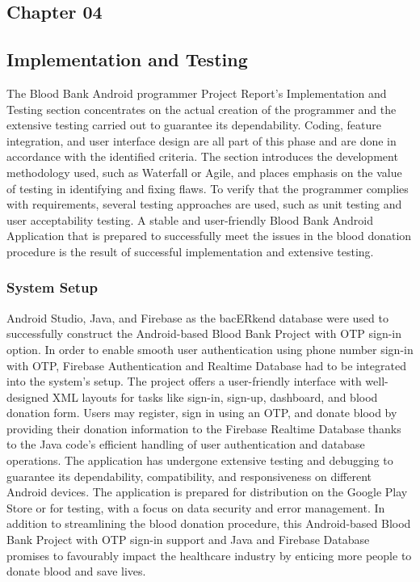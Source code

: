 \begin{center}
\chapter{Chapter 04}
\end{center}
\vspace{11mm}
\section{Implementation and Testing}
The Blood Bank Android programmer Project Report's Implementation and Testing section concentrates on the actual creation of the programmer and the extensive testing carried out to guarantee its dependability. Coding, feature integration, and user interface design are all part of this phase and are done in accordance with the identified criteria. The section introduces the development methodology used, such as Waterfall or Agile, and places emphasis on the value of testing in identifying and fixing flaws. To verify that the programmer complies with requirements, several testing approaches are used, such as unit testing and user acceptability testing. A stable and user-friendly Blood Bank Android Application that is prepared to successfully meet the issues in the blood donation procedure is the result of successful implementation and extensive testing.
\subsection{System Setup}
Android Studio, Java, and Firebase as the bacERkend database were used to successfully construct the Android-based Blood Bank Project with OTP sign-in option. In order to enable smooth user authentication using phone number sign-in with OTP, Firebase Authentication and Realtime Database had to be integrated into the system's setup. The project offers a user-friendly interface with well-designed XML layouts for tasks like sign-in, sign-up, dashboard, and blood donation form. Users may register, sign in using an OTP, and donate blood by providing their donation information to the Firebase Realtime Database thanks to the Java code's efficient handling of user authentication and database operations. The application has undergone extensive testing and debugging to guarantee its dependability, compatibility, and responsiveness on different Android devices. The application is prepared for distribution on the Google Play Store or for testing, with a focus on data security and error management. In addition to streamlining the blood donation procedure, this Android-based Blood Bank Project with OTP sign-in support and Java and Firebase Database promises to favourably impact the healthcare industry by enticing more people to donate blood and save lives.
\newpage
